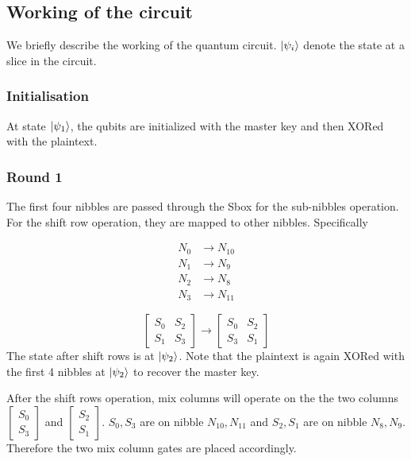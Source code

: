 \documentclass[preprint]{transcrypto}
\begin{document}
\subsection{Working of the circuit}
We briefly describe the working of the quantum circuit. $\ket{\psi_i}$ denote the state at a slice in the circuit.

\subsubsection{Initialisation}
At state $\ket{\psi_1}$, the qubits are initialized with the master key and then XORed with the plaintext.

\subsubsection{Round 1}

The first four nibbles are passed through the Sbox for the sub-nibbles operation. For the shift row operation, they are mapped to other nibbles. Specifically

\begin{align*}
    N_0 &\longrightarrow N_{10} \\
    N_1 &\longrightarrow N_9  \\
    N_2 &\longrightarrow N_8 \\
    N_3 &\longrightarrow N_{11}
\end{align*}

\[
    \begin{bmatrix}
    S_0 & S_2\\
    S_1 & S_3
    \end{bmatrix} \longrightarrow
    \begin{bmatrix}
    S_0 & S_2\\
    S_3 & S_1
    \end{bmatrix} 
\]
The state after shift rows is at $\ket{\psi_2}$. Note that the plaintext is again XORed with the first 4 nibbles at $\ket{\psi_2}$ to recover the master key.
 
After the shift rows operation, mix columns will operate on the the two columns $\begin{bmatrix}
S_0\\ S_3
\end{bmatrix}$ and $\begin{bmatrix}
S_2 \\ S_1
\end{bmatrix}$. $S_0, S_3$ are on nibble $N_{10}, N_{11}$ and $S_2, S_1$ are on nibble $N_8, N_9$. Therefore the two mix column gates are placed accordingly. 
\end{document}
